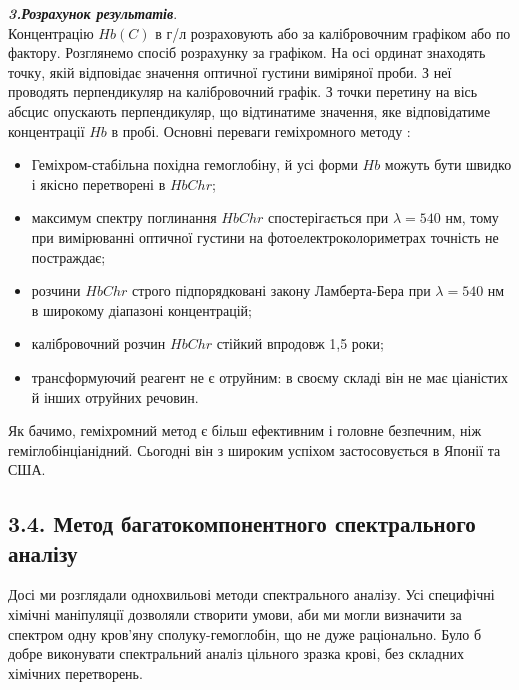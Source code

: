 \documentclass[14pt,a4paper]{scrartcl}
\begin{document}
{\bf\itshape 3.Розрахунок результатів}.\\

Концентрацію $Hb(C)$ в г/л розраховують або за калібровочним графіком або по фактору. Розглянемо спосіб розрахунку за графіком. На осі ординат знаходять точку, якій відповідає значення оптичної густини виміряної проби. З неї проводять перпендикуляр на калібровочний графік. З точки перетину на вісь абсцис опускають перпендикуляр, що відтинатиме значення, яке відповідатиме концентрації $Hb$ в пробі.
\newpage
 Основні переваги геміхромного методу \cite{l1} :
\begin{itemize}
\item Геміхром-стабільна похідна гемоглобіну, й усі форми $Hb$ можуть бути швидко і якісно перетворені в $HbChr$;
\item  максимум спектру поглинання $HbChr$ спостерігається при $\lambda=540$ нм, тому при вимірюванні оптичної густини на фотоелектроколориметрах точність не постраждає;
\item розчини $HbChr$ строго підпорядковані закону Ламберта-Бера при $\lambda=540$ нм в широкому діапазоні концентрацій;
\item калібровочний розчин $HbChr$ стійкий впродовж 1,5 роки;
\item трансформуючий реагент не є отруйним: в своєму складі він не має ціаністих й інших отруйних речовин.
\end{itemize}

Як бачимо, геміхромний метод є більш ефективним і головне безпечним, ніж геміглобінціанідний. Сьогодні він з широким успіхом застосовується в Японії та США.\\

\subsection*{3.4. Метод багатокомпонентного спектрального аналізу}

Досі ми розглядали однохвильові методи спектрального аналізу. Усі специфічні хімічні маніпуляції дозволяли створити умови, аби ми могли визначити за спектром одну кров'яну сполуку-гемоглобін, що не дуже раціонально. Було б добре виконувати спектральний аналіз цільного зразка крові, без складних хімічних перетворень.
\end{document}
